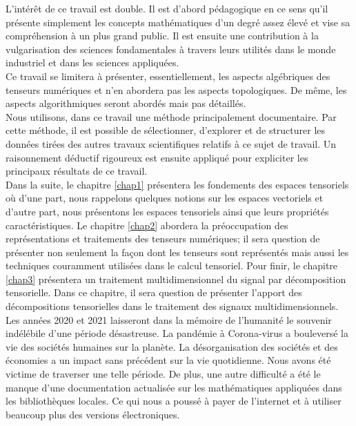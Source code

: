 \documentclass[11pt,a4paper,oneside]{book}
\begin{document}
L'intérêt de ce travail est double. Il est d'abord pédagogique en ce sens qu'il présente simplement les concepts mathématiques d'un degré assez élevé et vise sa compréhension à un plus grand public. Il est ensuite une contribution à la vulgarisation des sciences fondamentales à travers leurs utilités dans le monde industriel et dans les sciences appliquées.\\

Ce travail se limitera à présenter, essentiellement, les aspects algébriques des tenseurs numériques et n'en abordera pas les aspects topologiques. De même, les aspects algorithmiques seront abordés mais pas détaillés.\\

Nous utilisons, dans ce travail une méthode principalement documentaire. Par cette méthode, il est possible de sélectionner, d'explorer et de structurer les données tirées des autres travaux scientifiques relatifs à ce sujet de travail. Un raisonnement déductif rigoureux est ensuite appliqué pour expliciter les principaux résultats de ce travail.\\

Dans la suite, le chapitre \ref{chap1} présentera les fondements des espaces tensoriels où d'une part, nous rappelons quelques notions sur les espaces vectoriels et d'autre part, nous présentons les espaces tensoriels ainsi que leurs propriétés caractéristiques.
Le chapitre \ref{chap2} abordera la préoccupation des représentations et traitements des tenseurs numériques; il sera question de présenter non seulement la façon dont les tenseurs sont représentés mais aussi les techniques couramment utilisées dans le calcul tensoriel. Pour finir, le chapitre \ref{chap3} présentera un traitement multidimensionnel du signal par décomposition tensorielle. Dans ce chapitre, il sera question de présenter l'apport des décompositions tensorielles dans le traitement des signaux multidimensionnels.\\

Les années 2020 et 2021 laisseront dans la mémoire de l'humanité le souvenir indélébile d’une période désastreuse. La pandémie à Corona-virus a
bouleversé la vie des sociétés humaines sur la planète. La désorganisation des sociétés et des économies
a un impact sans précédent sur la vie quotidienne. Nous avons été victime de traverser une telle période. De plus, une autre difficulté a été le manque d'une documentation actualisée sur les mathématiques appliquées dans les bibliothèques locales. Ce qui nous a
poussé à payer de l'internet et à utiliser beaucoup plus des versions électroniques.
\end{document}
